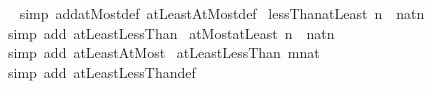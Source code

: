 \begin{isabellebody}
%
\isadelimproof
\ \ %
\endisadelimproof
%
\isatagproof
{}\isamarkupfalse%
{\isacharparenleft}{\kern0pt}simp\ add{\isacharcolon}{\kern0pt}atMost{\isacharunderscore}{\kern0pt}def\ atLeastAtMost{\isacharunderscore}{\kern0pt}def{\isacharparenright}{\kern0pt}%
\endisatagproof
{\isafoldproof}%
%
\isadelimproof
\isanewline
%
\endisadelimproof
\isanewline
{}\isamarkupfalse%
\ lessThan{\isacharunderscore}{\kern0pt}atLeast{}{\isacharcolon}{\kern0pt}\ {\isachardoublequoteopen}{\isacharbraceleft}{\kern0pt}{\isachardot}{\kern0pt}{\isachardot}{\kern0pt}{\isacharless}{\kern0pt}n{\isacharbraceright}{\kern0pt}\ {\isacharequal}{\kern0pt}\ {\isacharbraceleft}{\kern0pt}{}{\isacharcolon}{\kern0pt}{\isacharcolon}{\kern0pt}nat{\isachardot}{\kern0pt}{\isachardot}{\kern0pt}{\isacharless}{\kern0pt}n{\isacharbraceright}{\kern0pt}{\isachardoublequoteclose}\isanewline
%
\isadelimproof
\ \ %
\endisadelimproof
%
\isatagproof
{}\isamarkupfalse%
\ {\isacharparenleft}{\kern0pt}simp\ add{\isacharcolon}{\kern0pt}\ atLeast{}LessThan{\isacharparenright}{\kern0pt}%
\endisatagproof
{\isafoldproof}%
%
\isadelimproof
\isanewline
%
\endisadelimproof
\isanewline
{}\isamarkupfalse%
\ atMost{\isacharunderscore}{\kern0pt}atLeast{}{\isacharcolon}{\kern0pt}\ {\isachardoublequoteopen}{\isacharbraceleft}{\kern0pt}{\isachardot}{\kern0pt}{\isachardot}{\kern0pt}n{\isacharbraceright}{\kern0pt}\ {\isacharequal}{\kern0pt}\ {\isacharbraceleft}{\kern0pt}{}{\isacharcolon}{\kern0pt}{\isacharcolon}{\kern0pt}nat{\isachardot}{\kern0pt}{\isachardot}{\kern0pt}n{\isacharbraceright}{\kern0pt}{\isachardoublequoteclose}\isanewline
%
\isadelimproof
\ \ %
\endisadelimproof
%
\isatagproof
{}\isamarkupfalse%
\ {\isacharparenleft}{\kern0pt}simp\ add{\isacharcolon}{\kern0pt}\ atLeast{}AtMost{\isacharparenright}{\kern0pt}%
\endisatagproof
{\isafoldproof}%
%
\isadelimproof
\isanewline
%
\endisadelimproof
\isanewline
{}\isamarkupfalse%
\ atLeastLessThan{}{\isacharcolon}{\kern0pt}\ {\isachardoublequoteopen}{\isacharbraceleft}{\kern0pt}m{\isachardot}{\kern0pt}{\isachardot}{\kern0pt}{\isacharless}{\kern0pt}{}{\isacharcolon}{\kern0pt}{\isacharcolon}{\kern0pt}nat{\isacharbraceright}{\kern0pt}\ {\isacharequal}{\kern0pt}\ {\isacharbraceleft}{\kern0pt}{\isacharbraceright}{\kern0pt}{\isachardoublequoteclose}\isanewline
%
\isadelimproof
\ \ %
\endisadelimproof
%
\isatagproof
{}\isamarkupfalse%
\ {\isacharparenleft}{\kern0pt}simp\ add{\isacharcolon}{\kern0pt}\ atLeastLessThan{\isacharunderscore}{\kern0pt}def{\isacharparenright}{\kern0pt}%

\end{isabellebody}
